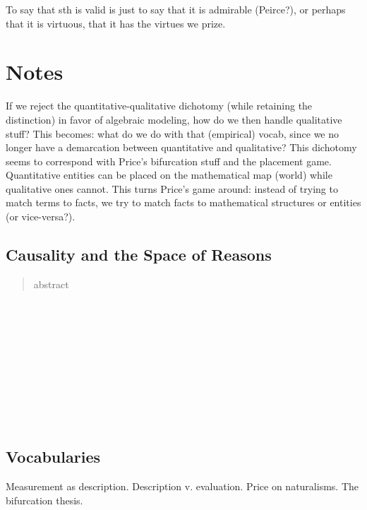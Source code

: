 \documentclass[11pt,twoside]{article}
\begin{document}
To say that sth is valid is just to say that it is admirable
(Peirce?), or perhaps that it is virtuous, that it has the virtues we
prize.

\section{Notes}

If we reject the quantitative-qualitative dichotomy (while retaining
the distinction) in favor of algebraic modeling, how do we then handle
qualitative stuff?  This becomes: what do we do with that (empirical)
vocab, since we no longer have a demarcation between quantitative and
qualitative?  This dichotomy seems to correspond with Price's
bifurcation stuff and the placement game.  Quantitative entities can
be placed on the mathematical map (world) while qualitative ones
cannot.  This turns Price's game around: instead of trying to match
terms to facts, we try to match facts to mathematical structures or
entities (or vice-versa?).

\subsection{Causality and the Space of Reasons}

\begin{abstract}
abstract
\end{abstract}

\noindent
\cite{abell_narrative_2004} \\
\cite{crane_mental_1995} \\
\cite{gross_pragmatist_2009} \\
\cite{jackson_mental_1996} \\
\cite{lowe_causal_1993} \\
\cite{lowe_non-cartesian_2006} \\
\cite{macdonald_mental_1986} \\
\cite{menzies_causation_1993} \\
\cite{morris_causes_1986} \\
\cite{williamson_broadness_1998}

\subsection{Vocabularies}

Measurement as description.  Description v. evaluation.  Price on
naturalisms.  The bifurcation thesis.
\end{document}
